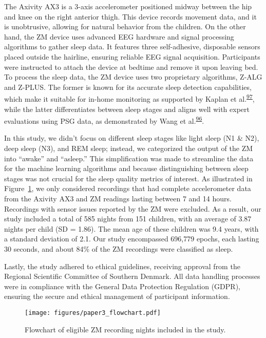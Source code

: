 \documentclass[
  9pt,
]{scrbook}
\begin{document}
The Axivity AX3 is a 3-axis accelerometer positioned midway between the
hip and knee on the right anterior thigh. This device records movement
data, and it is unobtrusive, allowing for natural behavior from the
children. On the other hand, the ZM device uses advanced EEG hardware
and signal processing algorithms to gather sleep data. It features three
self-adhesive, disposable sensors placed outside the hairline, ensuring
reliable EEG signal acquisition. Participants were instructed to attach
the device at bedtime and remove it upon leaving bed. To process the
sleep data, the ZM device uses two proprietary algorithms, Z-ALG and
Z-PLUS. The former is known for its accurate sleep detection
capabilities, which make it suitable for in-home monitoring as supported
by Kaplan et
al.\textsuperscript{\protect\hyperlink{ref-kaplan_performance_2014}{97}},
while the latter differentiates between sleep stages and aligns well
with expert evaluations using PSG data, as demonstrated by Wang et
al.\textsuperscript{\protect\hyperlink{ref-wang_evaluation_2015}{96}}.

In this study, we didn't focus on different sleep stages like light
sleep (N1 \& N2), deep sleep (N3), and REM sleep; instead, we
categorized the output of the ZM into ``awake'' and ``asleep.'' This
simplification was made to streamline the data for the machine learning
algorithms and because distinguishing between sleep stages was not
crucial for the sleep quality metrics of interest. As illustrated in
Figure~\ref{fig-paper3_flow}, we only considered recordings that had
complete accelerometer data from the Axivity AX3 and ZM readings lasting
between 7 and 14 hours. Recordings with sensor issues reported by the ZM
were excluded. As a result, our study included a total of 585 nights
from 151 children, with an average of 3.87 nights per child (SD = 1.86).
The mean age of these children was 9.4 years, with a standard deviation
of 2.1. Our study encompassed 696,779 epochs, each lasting 30 seconds,
and about 84\% of the ZM recordings were classified as sleep.

Lastly, the study adhered to ethical guidelines, receiving approval from
the Regional Scientific Committee of Southern Denmark. All data handling
processes were in compliance with the General Data Protection Regulation
(GDPR), ensuring the secure and ethical management of participant
information.

\begin{figure}

{\centering \texttt{[image: figures/paper3\_flowchart.pdf]}

}

\caption{\label{fig-paper3_flow}Flowchart of eligible ZM recording
nights included in the study.}

\end{figure}
\end{document}
